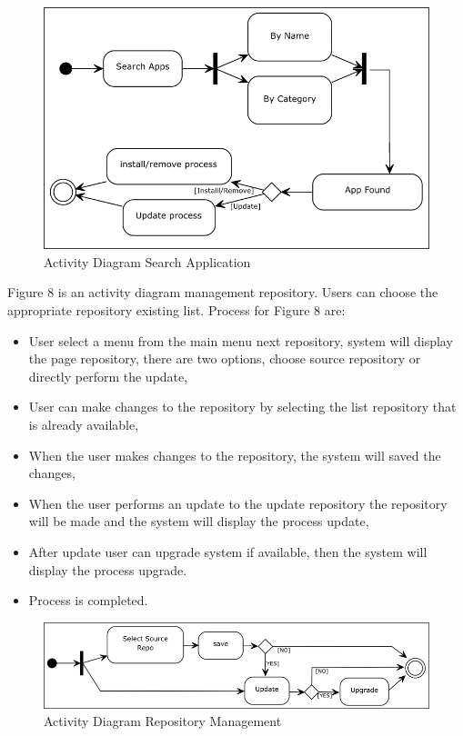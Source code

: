 \documentclass[conference, letterpaper]{IEEEtran}
\begin{document}
\begin{figure}[!t]
\centering
\includegraphics[scale=0.5]{image/ADSearchApp.png}
\caption{Activity Diagram Search Application}
\end{figure}

Figure 8 is an activity diagram management repository. Users can choose the appropriate repository existing list. Process for Figure 8 are:
\begin{itemize}
\item User select a menu from the main menu next repository, system will display the page repository, there are two options, choose source repository or directly perform the update,
\item User can make changes to the repository by selecting the list
repository that is already available,
\item When the user makes changes to the repository, the system will saved the changes,
\item When the user performs an update to the update repository the repository will be made and the system will display the process update,
\item After update user can upgrade system if available, then the system will display the process upgrade.
\item Process is completed.
\end{itemize}

\begin{figure}[!t]
\centering
\includegraphics[scale=0.5]{image/ADManagement.png}
\caption{Activity Diagram Repository Management}
\end{figure}
\end{document}
